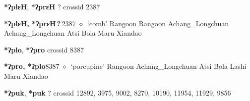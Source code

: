 \item
\textbf{*ʔplɛH}, \textbf{*ʔprɛH}
?
  {\tiny crossid 2387}
  \begin{list}{}{\leftmargin=1.5em \itemindent=-1.5em}
  \item {\footnotesize \textbf{*ʔplɛH, *ʔprɛH\,?\,}}{\tiny 2387}
         $\diamond$~`comb'
         Rangoon 
\hspace{1ex}
         Rangoon 
\hspace{1ex}
         Achang\_Longchuan 
\hspace{1ex}
         Achang\_Longchuan 
\hspace{1ex}
         Atsi 
\hspace{1ex}
         Bola 
\hspace{1ex}
         Maru 
\hspace{1ex}
         Xiandao 
  \end{list}
\item
\textbf{*ʔplo}, \textbf{*ʔpro}
  {\tiny crossid 8387}
  \begin{list}{}{\leftmargin=1.5em \itemindent=-1.5em}
  \item {\footnotesize \textbf{*ʔpro, *ʔplo}}{\tiny 8387}
         $\diamond$~`porcupine'
         Rangoon 
\hspace{1ex}
         Achang\_Longchuan 
\hspace{1ex}
         Atsi 
\hspace{1ex}
         Bola 
\hspace{1ex}
         Lashi 
\hspace{1ex}
         Maru 
\hspace{1ex}
         Xiandao 
  \end{list}
\item
\textbf{*ʔpuk}, \textbf{*puk}
?
  {\tiny crossid 12892, 3975, 9002, 8270, 10190, 11954, 11929, 9856}
